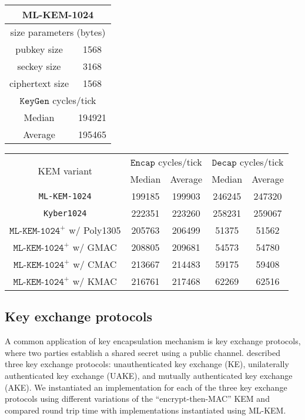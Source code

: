 \documentclass[journal=tches,submission]{iacrtrans}
\newcommand{\keygen}{\texttt{KeyGen}}
\newcommand{\encap}{\texttt{Encap}}
\newcommand{\decap}{\texttt{Decap}}
\begin{document}
\begin{table}[h]
    \begin{tabular}[t]{|cc|}
        \hline
        \multicolumn{2}{|c|}{\bf ML-KEM-1024} \\
        \hline
        \multicolumn{2}{|c|}{size parameters (bytes)} \\
        pubkey size & 1568 \\
        seckey size & 3168 \\
        ciphertext size & 1568 \\
        \hline
        \multicolumn{2}{|c|}{$\keygen$ cycles/tick} \\
        Median & 194921 \\
        Average & 195465 \\
        \hline
    \end{tabular}
    \begin{tabular}[t]{|c|c|c|c|c|}
        \hline
        \multirow{2}{*}{KEM variant} 
        & \multicolumn{2}{|c|}{$\encap$ cycles/tick} 
        & \multicolumn{2}{|c|}{$\decap$ cycles/tick} \\
        \cline{2-5}
        & Median & Average & Median & Average \\
        \hline
        \texttt{ML-KEM-1024} & 199185 & 199903 & 246245 & 247320 \\
        \hline
        \texttt{Kyber1024} & 222351 & 223260 & 258231 & 259067 \\
        \hline
        $\texttt{ML-KEM-1024}^+$ w/ Poly1305 & 205763 & 206499 & 51375 & 51562 \\
        \hline
        $\texttt{ML-KEM-1024}^+$ w/ GMAC & 208805 & 209681 & 54573 & 54780 \\
        \hline
        $\texttt{ML-KEM-1024}^+$ w/ CMAC & 213667 & 214483 & 59175 & 59408 \\
        \hline
        $\texttt{ML-KEM-1024}^+$ w/ KMAC & 216761 & 217468 & 62269 & 62516 \\
        \hline
    \end{tabular}
\end{table}

\subsection{Key exchange protocols}\label{sec:key-exchange-protocols}
A common application of key encapsulation mechanism is key exchange protocols, where two parties establish a shared secret using a public channel. \cite{bos2018crystals} described three key exchange protocols: unauthenticated key exchange (KE), unilaterally authenticated key exchange (UAKE), and mutually authenticated key exchange (AKE). We instantiated an implementation for each of the three key exchange protocols using different variations of the ``encrypt-then-MAC'' KEM and compared round trip time with implementations instantiated using ML-KEM.
\end{document}
